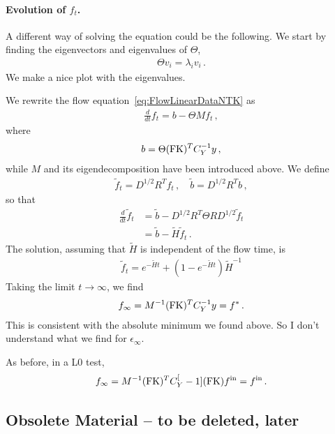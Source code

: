 \documentclass[11pt]{article}
\begin{document}
\paragraph{Evolution of $f_t$.}
A different way of solving the equation could be the following. We start by finding the eigenvectors and eigenvalues of $\Theta$,
\begin{align}
    \label{eq:ThetaEigensystem}
    \Theta v_i = \lambda_i v_i\, .
\end{align}
We make a nice plot with the eigenvalues. 

We rewrite the flow equation~\ref{eq:FlowLinearDataNTK} as
\begin{align}
    \frac{d}{dt} f_t = b - \Theta M f_t\, , 
\end{align}
where 
\begin{align}
    \label{eq:Defb}
    b = \Theta (\mathrm{FK})^T C_Y^{-1} y\, ,
\end{align}
while $M$ and its eigendecomposition have been introduced above. We define 
\begin{align}
    \label{eq:RotatedF}
    \tilde{f}_t = D^{1/2} R^T f_t\, , \quad \tilde{b} = D^{1/2} R^T b\, ,
\end{align}
so that 
\begin{align}
    \label{eq:EvolutionRotatedF}
    \frac{d}{dt} \tilde{f}_t &= \tilde{b} - D^{1/2} R^T \Theta R D^{1/2} \tilde{f}_t \\
        &= \tilde{b} - \tilde{H} \tilde{f}_t\, .
\end{align}
The solution, assuming that $\tilde{H}$ is independent of the flow time, is
\begin{align}
    \label{eq:FlowSolutionInFtilde}
    \tilde{f}_t = e^{-\tilde{H}t} + \left(1 - e^{-\tilde{H}t}\right) \tilde{H}^{-1}
\end{align}
Taking the limit $t\to\infty$, we find
\begin{align}
    \label{eq:InfiniteTrainingF}
    f_\infty = M^{-1} (\mathrm{FK})^T C_Y^{-1} y = f^*\, .
\end{align}
This is consistent with the absolute minimum we found above. So I don't understand 
what we find for $\epsilon_\infty$. 

As before, in a L0 test, 
\begin{align}
    f_\infty = M^{-1} (\mathrm{FK})^T C_Y^[-1] (\mathrm{FK}) f^{\mathrm{in}} = f^{\mathrm{in}}\, .
\end{align}

\subsection*{Obsolete Material -- to be deleted, later}
\end{document}

